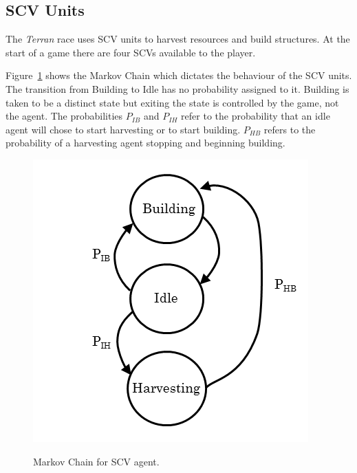 \subsection{SCV Units}

The \textit{Terran} race uses SCV units to harvest resources and build structures. At the start of a game there are four SCVs available to the player.

Figure~\ref{fig:scv_diagram} shows the Markov Chain which dictates the behaviour of the SCV units. The transition from Building to Idle has no probability assigned to it. Building is taken to be a distinct state but exiting the state is controlled by the game, not the agent. The probabilities \(P_{IB}\) and \(P_{IH}\) refer to the probability that an idle agent will chose to start harvesting or to start building. \(P_{HB}\) refers to the probability of a harvesting agent stopping and beginning building.

\begin{figure}
\centering
\includegraphics[scale=0.8, trim = 0cm 0cm 0cm 0cm]{diagrams/scv}
\label{fig:scv_diagram}
\caption{Markov Chain for SCV agent.}
\end{figure}